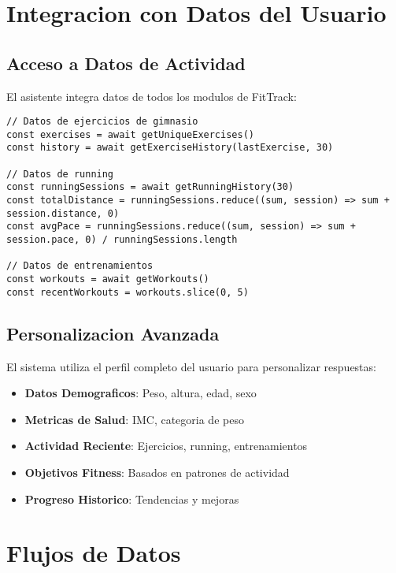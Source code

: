 \documentclass[12pt,a4paper]{article}
\begin{document}
\section{Integracion con Datos del Usuario}

\subsection{Acceso a Datos de Actividad}

El asistente integra datos de todos los modulos de FitTrack:

\begin{lstlisting}[caption=Integracion con datos de actividad]
// Datos de ejercicios de gimnasio
const exercises = await getUniqueExercises()
const history = await getExerciseHistory(lastExercise, 30)

// Datos de running
const runningSessions = await getRunningHistory(30)
const totalDistance = runningSessions.reduce((sum, session) => sum + session.distance, 0)
const avgPace = runningSessions.reduce((sum, session) => sum + session.pace, 0) / runningSessions.length

// Datos de entrenamientos
const workouts = await getWorkouts()
const recentWorkouts = workouts.slice(0, 5)
\end{lstlisting}

\subsection{Personalizacion Avanzada}

El sistema utiliza el perfil completo del usuario para personalizar respuestas:

\begin{itemize}
    \item \textbf{Datos Demograficos}: Peso, altura, edad, sexo
    \item \textbf{Metricas de Salud}: IMC, categoria de peso
    \item \textbf{Actividad Reciente}: Ejercicios, running, entrenamientos
    \item \textbf{Objetivos Fitness}: Basados en patrones de actividad
    \item \textbf{Progreso Historico}: Tendencias y mejoras
\end{itemize}

\section{Flujos de Datos}
\end{document}
